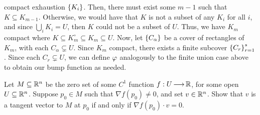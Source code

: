 \begin{soln}
    compact exhaustion $ \left\{{K_{i}}\right\} $. Then, there must exist some $ m-1 $
    such that $ K \subseteq K_{m-1} $. Otherwise, we would have that $ K $ is not
    a subset of any $ K_{i} $ for all $ i $, and since $ \bigcup_{i}K_{i} = U $,
    then $ K $ could not be a subset of $ U $. Thus, we have $ K_{m} $ compact
    where $ K \subseteq K_{m}^{\circ} \subseteq K_{m} \subseteq U $. \vsp
    Now, let $ \left\{{C_{\alpha}}\right\} $ be a cover of rectangles of $ K_{m} $, with
    each $ C_{\alpha} \subsetneq U $. Since $ K_{m} $ compact, there exists a
    finite subcover $ \left\{{C_{r}}\right\}_{r=1}^{s} $. Since each $ C_{r} \subsetneq U $,
    we can define $ \operatorname{\varphi} $ analogously to the finite union case above to obtain
    our bump function as needed.
\end{soln}

%
%


\newpage
\label{q32}
\begin{qu}[num=32.1]
    Let $ M \subseteq \mathbb{R}^{n} $ be the zero set of some $ C^{1} $ function
    $ f: U \operatorname{\longrightarrow} \mathbb{R} $, for some open $ U \subseteq \mathbb{R}^{n} $. Suppose $ p_{0}
    \in M $ such that $ \nabla f(p_{0}) \neq 0 $, and set $ v \in \mathbb{R}^{n} $.
    Show that $ v $ is a tangent vector to $ M $ at $ p_{0} $ if and only if
    $ \nabla f(p_{0}) \cdot v = 0 $.
\end{qu}

